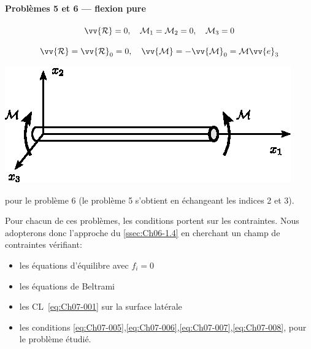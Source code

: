 \paragraph{Problèmes 5 et 6 --- flexion pure}
\begin{equation}
    \vv{\mathcal{R}} = 0 , \quad \mathcal{M}_1 = \mathcal{M}_2 = 0, \quad \mathcal{M}_3 = 0
    \label{eq:Ch07-012}
\end{equation}
\begin{multicols}{2}
    \begin{equation*}
        \vv{\mathcal{R}} = \vv{\mathcal{R}}_0 = 0, \quad \vv{\mathcal{M}} = -\vv{\mathcal{M}}_0 = \mathcal{M} \vv{e}_3
    \end{equation*}
    \columnbreak
    \begin{center}
        \includegraphics{../images/T1_Ch07-05}
    \end{center}
\end{multicols}
pour le problème 6 (le problème 5 s'obtient en échangeant les indices 2 et 3).

Pour chacun de ces problèmes, les conditions portent sur les contraintes.
Nous adopterons donc l'approche du \ref{ssec:Ch06-1.4} en cherchant un champ de contraintes vérifiant:
\begin{itemize}
    \item les équations d'équilibre avec $f_i=0$
    \item les équations de Beltrami
    \item les CL~\eqref{eq:Ch07-001} sur la surface latérale
    \item les conditions \eqref{eq:Ch07-005},\eqref{eq:Ch07-006},\eqref{eq:Ch07-007},\eqref{eq:Ch07-008}, pour le problème étudié.
\end{itemize}
